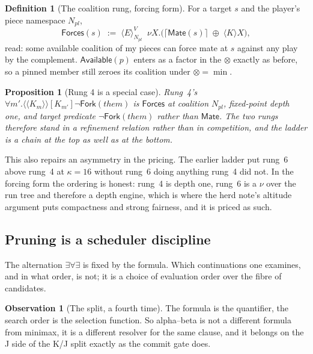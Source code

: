 \documentclass[11pt,a4paper]{article}
\theoremstyle{plain}
\newtheorem{proposition}[theorem]{Proposition}
\theoremstyle{definition}
\newtheorem{definition}[theorem]{Definition}
\newtheorem{observation}[theorem]{Observation}
\theoremstyle{remark}
\newcommand{\KKmod}[1]{\langle\!\langle K_{#1}\rangle\!\rangle}
\newcommand{\Bmod}[1]{[K_{#1}]}
\newcommand{\Emod}[2]{\langle E\rangle^{#2}_{#1}}
\begin{document}
\begin{definition}[The coalition rung, forcing form]
\label{def:forcing}
For a target $s$ and the player's piece namespace $N_{\mathit{pl}}$,
\[
  \mathsf{Forces}(s) \;:=\;
  \Emod{N_{\mathit{pl}}}{V}\;\;
  \nu X.\big(\lceil \mathsf{Mate}(s) \rceil \;\oplus\; \langle K\rangle X\big),
\]
read: some available coalition of my pieces can force mate at $s$ against any
play by the complement. $\mathsf{Available}(p)$ enters as a factor in the
$\otimes$ exactly as before, so a pinned member still zeroes its coalition under
$\otimes = \min$.
\end{definition}

\begin{proposition}[Rung 4 is a special case]
\label{prop:rung4special}
Rung~4's $\forall m'.\KKmod{m}\Bmod{m'}\neg\mathsf{Fork}(\mathit{them})$ is
$\mathsf{Forces}$ at coalition $N_{\mathit{pl}}$, fixed-point depth one, and
target predicate $\neg\mathsf{Fork}(\mathit{them})$ rather than
$\mathsf{Mate}$. The two rungs therefore stand in a refinement relation rather
than in competition, and the ladder is a chain at the top as well as at the
bottom.
\end{proposition}

This also repairs an asymmetry in the pricing. The earlier ladder put rung~6
above rung~4 at $\kappa = 16$ without rung~6 doing anything rung~4 did not. In
the forcing form the ordering is honest: rung~4 is depth one, rung~6 is a $\nu$
over the run tree and therefore a depth engine, which is where the herd note's
altitude argument puts compactness and strong fairness, and it is priced as
such.

\subsection{Pruning is a scheduler discipline}
\label{sec:prune}

The alternation $\exists\forall\exists$ is fixed by the formula. Which
continuations one examines, and in what order, is not; it is a choice of
evaluation order over the fibre of candidates.

\begin{observation}[The split, a fourth time]
\label{obs:kj4}
The formula is the quantifier, the search order is the selection function. So
alpha--beta is not a different formula from minimax, it is a different resolver
for the same clause, and it belongs on the J side of the K/J split exactly as
the commit gate does.
\end{observation}
\end{document}
